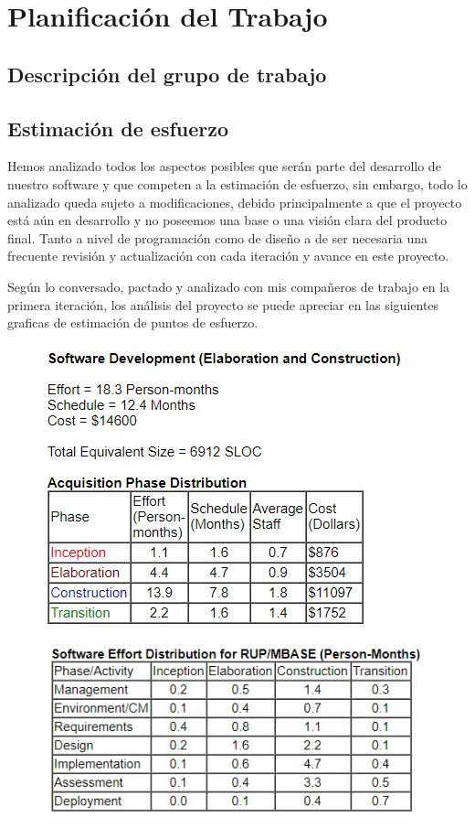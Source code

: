 \section{Planificación del Trabajo}

\subsection{Descripción del grupo de trabajo}

\subsection{Estimación de esfuerzo}
Hemos analizado todos los aspectos posibles que serán parte del desarrollo de nuestro software y que competen a la estimación de esfuerzo, sin embargo, todo lo analizado queda sujeto a modificaciones, debido principalmente a que el proyecto está aún en desarrollo y no poseemos una base o una visión clara del producto final. Tanto a nivel de programación como de diseño a de ser necesaria una frecuente revisión y actualización con cada iteración y avance en este proyecto.

Según lo conversado, pactado y analizado con mis compañeros de trabajo en la primera iteración, los análisis del proyecto se puede apreciar en las siguientes graficas de estimación de puntos de esfuerzo.
\begin{figure}[htbp]
	\includegraphics{1.JPG}
	\includegraphics[scale=0.9]{2.JPG}
\end{figure}


